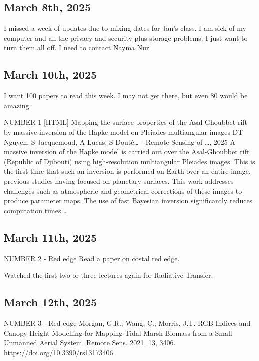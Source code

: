 \documentclass{article}
\begin{document}
\subsection{March 8th, 2025}
I missed a week of updates due to mixing dates for Jan's class. I am sick of my computer and all the privacy and security plus storage problems. I just want to turn them all off. I need to contact Nayma Nur. 


\subsection{March 10th, 2025}
I want 100 papers to read this week. I may not get there, but even 80 would be amazing. 

NUMBER 1 
[HTML] Mapping the surface properties of the Asal-Ghoubbet rift by massive inversion of the Hapke model on Pleiades multiangular images
DT Nguyen, S Jacquemoud, A Lucas, S Douté… - Remote Sensing of …, 2025
A massive inversion of the Hapke model is carried out over the Asal-Ghoubbet rift
(Republic of Djibouti) using high-resolution multiangular Pleiades images. This is the
first time that such an inversion is performed on Earth over an entire image, previous
studies having focused on planetary surfaces. This work addresses challenges such
as atmospheric and geometrical corrections of these images to produce parameter
maps. The use of fast Bayesian inversion significantly reduces computation times …

\subsection{March 11th, 2025}
NUMBER 2 - Red edge
Read a paper on costal red edge. 

Watched the first two or three lectures again for Radiative Transfer. 


\subsection{March 12th, 2025}
NUMBER 3 - Red edge
Morgan, G.R.; Wang, C.; Morris, J.T. RGB Indices and Canopy Height Modelling for Mapping Tidal Marsh Biomass from a Small Unmanned Aerial System. Remote Sens. 2021, 13, 3406. https://doi.org/10.3390/rs13173406
\end{document}

